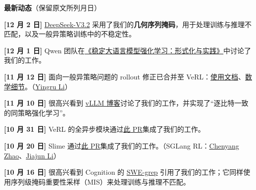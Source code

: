 
\textbf{最新动态}（保留原文所列月日）



\textbf{[12 月 2 日]} \href{https://arxiv.org/abs/2512.02556}{DeepSeek-V3.2} 采用了我们的\textbf{几何序列掩码}，用于处理训练与推理不匹配，以及一般异策略训练中的不稳定性。



\textbf{[12 月 1 日]} Qwen 团队在\href{https://arxiv.org/abs/2512.01374}{《稳定大语言模型强化学习：形式化与实践》}中讨论了我们的工作。



\textbf{[11 月 12 日]} 面向一般异策略问题的 rollout 修正已合并至 VeRL：\href{https://verl.readthedocs.io/en/latest/algo/rollout_corr.html}{使用文档}、\href{https://verl.readthedocs.io/en/latest/algo/rollout_corr_math.html}{数学细节}。（\href{https://richardli.xyz/}{Yingru Li}）



\textbf{[11 月 10 日]} 很高兴看到 \href{https://blog.vllm.ai/2025/11/10/bitwise-consistent-train-inference.html}{vLLM 博客}讨论了我们的工作，并实现了“逐比特一致的同策略强化学习”。



\textbf{[10 月 31 日]} VeRL 的全异步模块通过\href{https://github.com/volcengine/verl/pull/3955}{此 PR}集成了我们的工作。



\textbf{[10 月 20 日]} Slime 通过\href{https://github.com/THUDM/slime/pull/429}{此 PR}集成了我们的工作。（SGLang RL：\href{https://github.com/zhaochenyang20}{Chenyang Zhao}、\href{https://www.linkedin.com/in/jiajun-li-guapisolo/}{Jiajun Li}）



\textbf{[10 月 16 日]} 很高兴看到 Cognition 的 \href{https://cognition.ai/blog/swe-grep#motivation}{SWE-grep} 引用了我们的工作；它同样使用序列级掩码重要性采样（MIS）来处理训练与推理不匹配。


